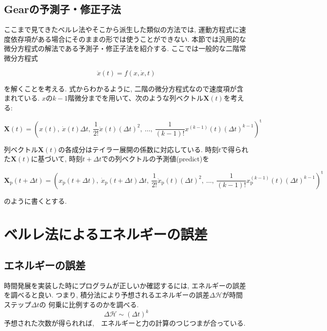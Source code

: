 \subsection{Gearの予測子・修正子法}

ここまで見てきたベルレ法やそこから派生した類似の方法では, 運動方程式に速度依存項がある場合にそのままの形では使うことができない.
本節では汎用的な微分方程式の解法である予測子・修正子法を紹介する\cite{2003Nose}.
ここでは一般的な二階常微分方程式

\begin{equation}
  \ddot{x}(t) = f(x, \dot{x}, t)
\end{equation}

を解くことを考える. 式からわかるように, 二階の微分方程式なので速度項が含まれている.
$x$の$k-1$階微分までを用いて、次のような列ベクトル$\bm{X}(t)$を考える:

\begin{equation}
  \bm{X}(t)
  =
  \left(
    x(t),~
    \dot{x}(t) \Delta t,~
    \frac{1}{2!} \ddot{x}(t) (\Delta t)^{2}
    ,~\ldots,~
    \frac{1}{(k-1)!}x^{(k-1)}(t) (\Delta t)^{k-1}
  \right)^{\mathrm{t}}
\end{equation}

列ベクトル$\bm{X}(t)$の各成分はテイラー展開の係数に対応している.
時刻$t$で得られた$\bm{X}(t)$に基づいて, 時刻$t + \Delta t$での列ベクトルの予測値(predict)を

\begin{equation}
  \bm{X}_{\mathrm{p}}(t + \Delta t)
  =
  \left(
    x_{\mathrm{p}}(t + \Delta t),~
    \dot{x}_{\mathrm{p}} (t + \Delta t) \Delta t,~
    \frac{1}{2!} \ddot{x}_{\mathrm{p}}(t) (\Delta t)^{2}
    ,~\ldots,~
    \frac{1}{(k-1)!}x^{(k-1)}_{\mathrm{p}}(t) (\Delta t)^{k-1}
  \right)^{\mathrm{t}}
\end{equation}

のように書くとする.


\section{ベルレ法によるエネルギーの誤差}
\subsection{エネルギーの誤差}
時間発展を実装した時にプログラムが正しいか確認するには, エネルギーの誤差を調べると良い.
つまり, 積分法により予想されるエネルギーの誤差$\Delta \mathcal{H}$が時間ステップ$\Delta t$の
何乗に比例するのかを調べる.
\begin{equation}
 \Delta \mathcal{H} \sim (\Delta t)^{k}
\end{equation}
予想された次数が得られれば,　エネルギーと力の計算のつじつまが合っている.

